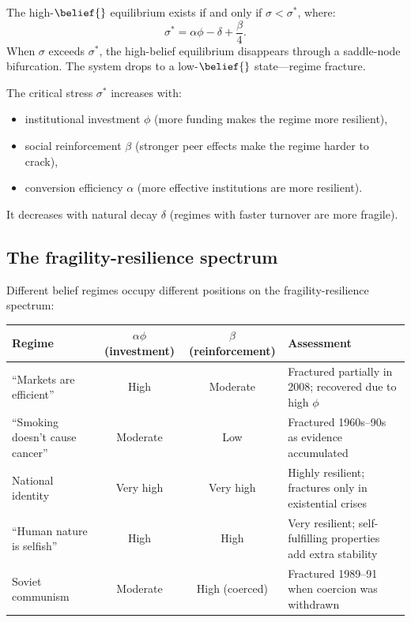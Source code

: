 \begin{proposition}
\label{prop:critical-stress}
The high-$\belief{}$ equilibrium exists if and only if $\sigma < \sigma^*$, where:
\[
  \sigma^* = \alpha\phi - \delta + \frac{\beta}{4}.
\]
When $\sigma$ exceeds $\sigma^*$, the high-belief equilibrium disappears through a saddle-node bifurcation.
The system drops to a low-$\belief{}$ state---regime fracture.

The critical stress $\sigma^*$ increases with:
\begin{itemize}[nosep]
  \item institutional investment $\phi$ (more funding makes the regime more resilient),
  \item social reinforcement $\beta$ (stronger peer effects make the regime harder to crack),
  \item conversion efficiency $\alpha$ (more effective institutions are more resilient).
\end{itemize}
It decreases with natural decay $\delta$ (regimes with faster turnover are more fragile).
\end{proposition}

\subsection{The fragility-resilience spectrum}

\begin{example}
\label{ex:fragility-spectrum}
Different belief regimes occupy different positions on the fragility-resilience spectrum:

\begin{center}
\begin{tabular}{p{3.5cm}ccp{4cm}}
\toprule
Regime & $\alpha\phi$ (investment) & $\beta$ (reinforcement) & Assessment \\
\midrule
``Markets are efficient'' & High & Moderate & Fractured partially in 2008; recovered due to high $\phi$ \\[4pt]
``Smoking doesn't cause cancer'' & Moderate & Low & Fractured 1960s--90s as evidence accumulated \\[4pt]
National identity & Very high & Very high & Highly resilient; fractures only in existential crises \\[4pt]
``Human nature is selfish'' & High & High & Very resilient; self-fulfilling properties add extra stability \\[4pt]
Soviet communism & Moderate & High (coerced) & Fractured 1989--91 when coercion was withdrawn \\
\bottomrule
\end{tabular}
\end{center}
\end{example}

